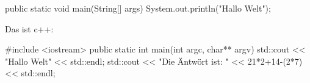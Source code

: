 \documentclass{article}
\begin{document}
\begin{java}
public static void main(String[] args) {
    System.out.println("Hallo Welt");
}
\end{java}
Das ist c++:
\begin{cpp}
#include <iostream>
public static int main(int argc, char** argv) {
    std::cout << "Hallo Welt" << std::endl;
    std::cout << "Die Äntwört ist: " << 21*2+14-(2*7) << std::endl;
}
\end{cpp}
\end{document}
